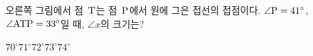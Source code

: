 \noindent\begin{minipage}[t]{0.58\linewidth}\vspace{0pt}\raggedright 오른쪽 그림에서 점~$\mathrm{T}$는 점~$\mathrm{P}$에서 원에 그은 접선의 접점이다. $\angle\mathrm{P}=41^\circ$, $\angle\mathrm{ATP}=33^\circ$일 때, $\angle x$의 크기는?\end{minipage}\hfill\begin{minipage}[t]{0.4\linewidth}\vspace{0pt}\centering \resizebox{\ifdim\width>\linewidth\linewidth\else\width\fi}{!}{}\end{minipage}\par
\begin{choicesii}{$70^\circ$}{$71^\circ$}{$72^\circ$}{$73^\circ$}{$74^\circ$}\end{choicesii}
